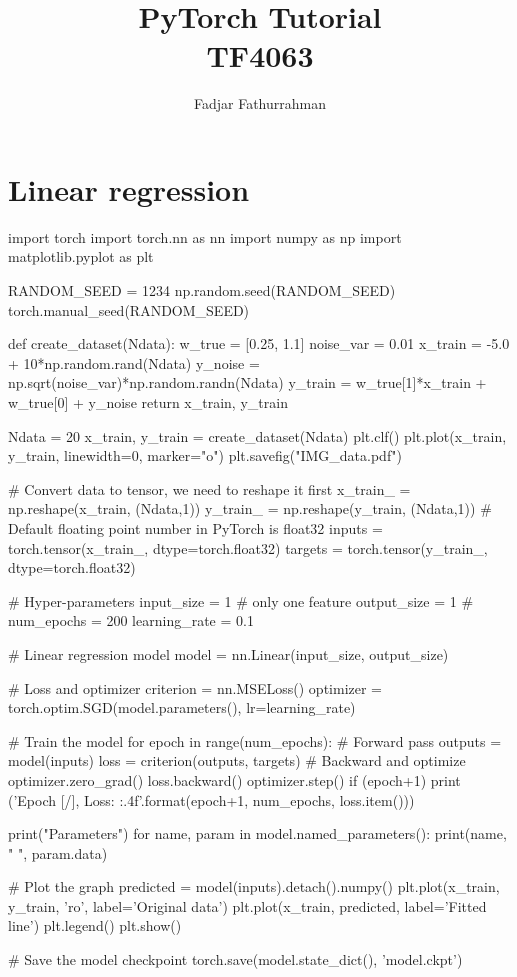 \documentclass[a4paper,11pt]{article} %
\begin{document}
\title{PyTorch Tutorial\\
TF4063}
\author{Fadjar Fathurrahman}
\date{}
\maketitle

\section{Linear regression}

\begin{pythoncode}
import torch
import torch.nn as nn
import numpy as np
import matplotlib.pyplot as plt
    
RANDOM_SEED = 1234
np.random.seed(RANDOM_SEED)
torch.manual_seed(RANDOM_SEED)
    
def create_dataset(Ndata):
    w_true = [0.25, 1.1]
    noise_var = 0.01
    x_train = -5.0 + 10*np.random.rand(Ndata)
    y_noise = np.sqrt(noise_var)*np.random.randn(Ndata)
    y_train = w_true[1]*x_train + w_true[0] + y_noise
    return x_train, y_train

Ndata = 20
x_train, y_train = create_dataset(Ndata)
plt.clf()
plt.plot(x_train, y_train, linewidth=0, marker="o")
plt.savefig("IMG_data.pdf")

# Convert data to tensor, we need to reshape it first
x_train_ = np.reshape(x_train, (Ndata,1))
y_train_ = np.reshape(y_train, (Ndata,1))
# Default floating point number in PyTorch is float32
inputs = torch.tensor(x_train_, dtype=torch.float32)
targets = torch.tensor(y_train_, dtype=torch.float32)

# Hyper-parameters
input_size = 1 # only one feature
output_size = 1 # 
num_epochs = 200
learning_rate = 0.1

# Linear regression model
model = nn.Linear(input_size, output_size)
    
# Loss and optimizer
criterion = nn.MSELoss()
optimizer = torch.optim.SGD(model.parameters(), lr=learning_rate)

# Train the model
for epoch in range(num_epochs):
    # Forward pass
    outputs = model(inputs)
    loss = criterion(outputs, targets)
    # Backward and optimize
    optimizer.zero_grad()
    loss.backward()
    optimizer.step()        
    if (epoch+1) %
        print ('Epoch [{}/{}], Loss: {:.4f}'.format(epoch+1, num_epochs, loss.item()))

print("Parameters")
for name, param in model.named_parameters():
    print(name, " ", param.data)
    
# Plot the graph
predicted = model(inputs).detach().numpy()
plt.plot(x_train, y_train, 'ro', label='Original data')
plt.plot(x_train, predicted, label='Fitted line')
plt.legend()
plt.show()
    
# Save the model checkpoint
torch.save(model.state_dict(), 'model.ckpt')
\end{pythoncode}
\end{document}
